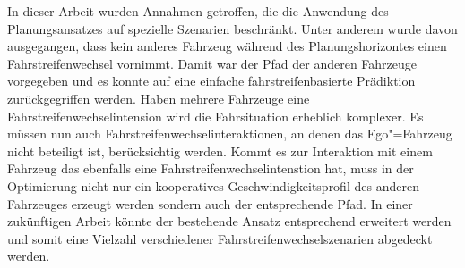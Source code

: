 In dieser Arbeit wurden Annahmen getroffen, die die Anwendung des Planungsansatzes auf spezielle Szenarien beschr\"ankt.
Unter anderem wurde davon ausgegangen, dass kein anderes Fahrzeug w\"ahrend des Planungshorizontes einen Fahrstreifenwechsel vornimmt.
Damit war der Pfad der anderen Fahrzeuge vorgegeben und es konnte auf eine einfache fahrstreifenbasierte Pr\"adiktion zur\"uckgegriffen werden.
Haben mehrere Fahrzeuge eine Fahrstreifenwechselintension wird die Fahrsituation erheblich komplexer.
Es m\"ussen nun auch Fahrstreifenwechselinteraktionen, an denen das Ego"=Fahrzeug nicht beteiligt ist, ber\"ucksichtig werden.
Kommt es zur Interaktion mit einem Fahrzeug das ebenfalls eine Fahrstreifenwechselintenstion hat, muss in der Optimierung nicht nur ein kooperatives Geschwindigkeitsprofil des anderen Fahrzeuges erzeugt werden sondern auch der entsprechende Pfad.
In einer zuk\"unftigen Arbeit k\"onnte der bestehende Ansatz entsprechend erweitert werden und somit eine Vielzahl verschiedener Fahrstreifenwechselszenarien abgedeckt werden.